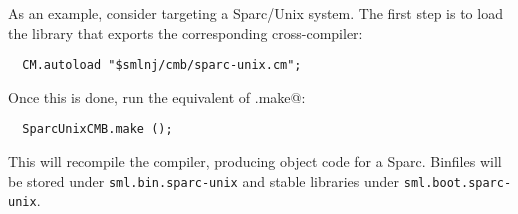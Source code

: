 As an example, consider targeting a Sparc/Unix system.  The first step
is to load the library that exports the corresponding cross-compiler:

\begin{lstlisting}
  CM.autoload "$smlnj/cmb/sparc-unix.cm";
\end{lstlisting}%

Once this is done, run the equivalent of \lstinline@CMB.make@:

\begin{lstlisting}
  SparcUnixCMB.make ();
\end{lstlisting}%

This will recompile the compiler, producing object code for a Sparc.
Binfiles will be stored under {\tt sml.bin.sparc-unix} and stable
libraries under {\tt sml.boot.sparc-unix}.
